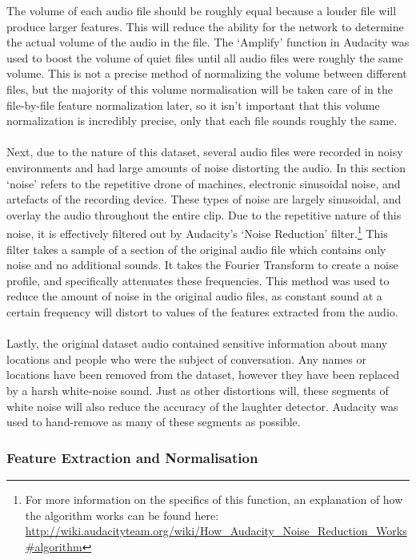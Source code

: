 \documentclass[a4paper,11pt,notitlepage]{article}
\begin{document}
The volume of each audio file should be roughly equal because a louder file will produce larger features. This will reduce the ability for the network to determine the actual volume of the audio in the file. The `Amplify' function in Audacity was used to boost the volume of quiet files until all audio files were roughly the same volume. This is not a precise method of normalizing the volume between different files, but the majority of this volume normalisation will be taken care of in the file-by-file feature normalization later, so it isn't important that this volume normalization is incredibly precise, only that each file sounds roughly the same.\\
\\
Next, due to the nature of this dataset, several audio files were recorded in noisy environments and had large amounts of noise distorting the audio. In this section `noise' refers to the repetitive drone of machines, electronic sinusoidal noise, and artefacts of the recording device. These types of noise are largely sinusoidal, and overlay the audio throughout the entire clip. Due to the repetitive nature of this noise, it is effectively filtered out by Audacity's `Noise Reduction' filter.\footnote{For more information on the specifics of this function, an explanation of how the algorithm works can be found here: \url{http://wiki.audacityteam.org/wiki/How_Audacity_Noise_Reduction_Works#algorithm}} This filter takes a sample of a section of the original audio file which contains only noise and no additional sounds. It takes the Fourier Transform to create a noise profile, and specifically attenuates these frequencies. This method was used to reduce the amount of noise in the original audio files, as constant sound at a certain frequency will distort to values of the features extracted from the audio.\\
\\
Lastly, the original dataset audio contained sensitive information about many locations and people who were the subject of conversation. Any names or locations have been removed from the dataset, however they have been replaced by a harsh white-noise sound. Just as other distortions will, these segments of white noise will also reduce the accuracy of the laughter detector.  Audacity was used to hand-remove as many of these segments as possible.

\subsubsection{Feature Extraction and Normalisation}
\end{document}
